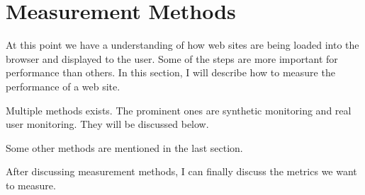 
















\section{Measurement Methods}



At this point we have a understanding of how web sites are being loaded into the browser and displayed to the user.
Some of the steps are more important for performance than others.
In this section, I will describe how to measure the performance of a web site.


Multiple methods exists.
The prominent ones are synthetic monitoring and real user monitoring.
They will be discussed below.

Some other methods are mentioned in the last section.

After discussing measurement methods, I can finally discuss the metrics we want to measure.







